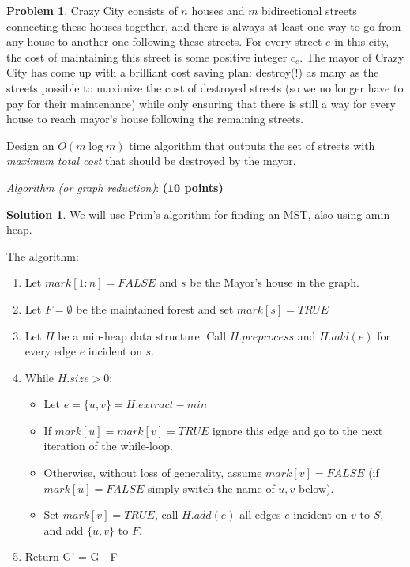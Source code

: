 \documentclass{article}
\theoremstyle{definition}
\newtheorem{problem}{Problem}
\newtheorem*{solution*}{Solution}
\newenvironment{solution}{\begin{solution*}}{{} \end{solution*}}
\newcommand{\grade}[1]{\hfill{\textbf{($\mathbf{#1}$ points)}}}
\begin{document}
\newpage

\begin{problem}\label{mst}
	Crazy City consists of $n$ houses and $m$ bidirectional streets connecting these houses together, and there is always at least one way to go from any house to another one following these streets. 
	For every street $e$ in this city, the cost of maintaining this street is some positive integer $c_e$. 
	The mayor of Crazy City has come up with a brilliant cost saving plan: destroy(!) as many as the streets possible to maximize the cost of destroyed streets (so we no longer have to pay for their maintenance) while only ensuring that there is still a way for every house to reach mayor's house following the remaining streets. 
	
	Design an $O(m\log{m})$ time algorithm that outputs the set of streets with \emph{maximum total cost} that should be destroyed by the mayor. 

\begin{enumerate}
	\item[(a)] \emph{Algorithm (or graph reduction)}: \grade{10} 
	
	
\begin{solution}
	\item We will use Prim’s algorithm for finding an MST, also using amin-heap. 
	\item The algorithm:
	\begin{enumerate}
	\item Let $mark[1 :n] = FALSE$ and $s$ be the Mayor's house in the graph.
	\item Let $F = \emptyset$ be the maintained forest and set $mark[s] = TRUE$
	\item Let $H$ be a min-heap data structure: Call $H.preprocess$ and $H.add(e)$ for every edge $e$ incident on $s$.
	\item While $H.size > 0$:
	\begin{itemize}
	\item Let $e = \{u, v\} = H.extract-min$ 
	\item If $mark[u] =mark[v] =TRUE$ ignore this edge and go to the next iteration of the while-loop.
	\item Otherwise, without loss of generality, assume $mark[v] =FALSE$ (if $mark[u] =FALSE$ simply switch the name of $u,v$ below).
	\item Set $mark[v] =TRUE$, call $H.add(e)$ all edges $e$ incident on $v$ to $S$, and add $\{u,v\}$ to $F$.
	\end{itemize}
	\item Return G' = G - F
	\end{enumerate}
\end{solution}


\end{enumerate}
\end{problem}
\end{document}
